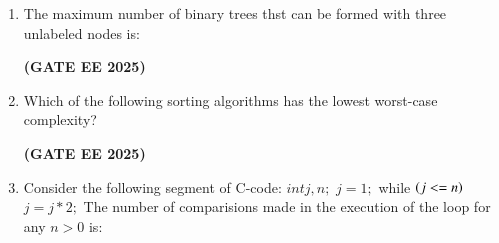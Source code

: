 \documentclass[journal,12pt,onecolumn]{IEEEtran}
\theoremstyle{remark}
\begin{document}
\begin{enumerate}
\begin{enumerate}
\begin{multicols}{4}
\end{multicols}
\end{enumerate}
\hfill \textbf{(GATE EE 2025)}
\item    The maximum number of binary trees thst can be formed with three unlabeled nodes is:
\begin{enumerate}

\end{enumerate}
\hfill \textbf{(GATE EE 2025)}
\item    Which of the following sorting algorithms has the lowest worst-case complexity?
\begin{enumerate}


\end{enumerate}
\hfill \textbf{(GATE EE 2025)}
  
\item    Consider the following segment of C-code:
\newline
     $int j,n;$
     \newline
    $  j=1;$
    \newline
    while $\left(j<=n\right)$
    \newline
          $j=j*2;$
          \newline
The number of comparisions made in the execution of the loop for any $n>0$ is:
\begin{enumerate}
    

\end{enumerate}
\end{enumerate}
\end{document}

